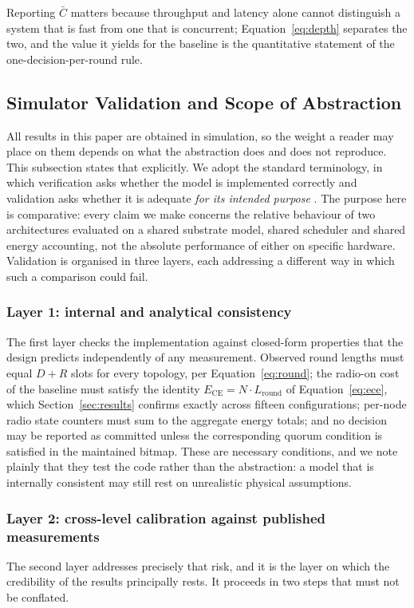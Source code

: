 \documentclass[journal]{IEEEtran}
\newcommand{\Nnodes}{N}                   %
\newcommand{\Diam}{D}                     %
\newcommand{\Nretx}{R}                    %
\newcommand{\Lround}{L_{\mathrm{round}}}  %
\newcommand{\Cdepth}{\bar{C}}             %
\newcommand{\Ece}{E_{\mathrm{CE}}}        %
\begin{document}
Reporting $\Cdepth$ matters because throughput and latency alone cannot
distinguish a system that is fast from one that is concurrent;
Equation~\eqref{eq:depth} separates the two, and the value it yields for
the baseline is the quantitative statement of the one-decision-per-round
rule.

\subsection{Simulator Validation and Scope of Abstraction}
\label{sec:method-validation}
All results in this paper are obtained in simulation, so the weight a
reader may place on them depends on what the abstraction does and does not
reproduce. This subsection states that explicitly. We adopt the standard
terminology, in which verification asks whether the model is implemented
correctly and validation asks whether it is adequate \emph{for its
intended purpose} \cite{sargent13validation}. The purpose here is
comparative: every claim we make concerns the relative behaviour of two
architectures evaluated on a shared substrate model, shared scheduler and
shared energy accounting, not the absolute performance of either on
specific hardware. Validation is organised in three layers, each
addressing a different way in which such a comparison could fail.

\subsubsection{Layer 1: internal and analytical consistency}
The first layer checks the implementation against closed-form properties
that the design predicts independently of any measurement. Observed round
lengths must equal $\Diam + \Nretx$ slots for every topology, per
Equation~\eqref{eq:round}; the radio-on cost of the baseline must satisfy
the identity $\Ece = \Nnodes \cdot \Lround$ of
Equation~\eqref{eq:ece}, which Section~\ref{sec:results} confirms exactly
across fifteen configurations; per-node radio state
counters must sum to the aggregate energy totals; and no decision may be
reported as committed unless the corresponding quorum condition is
satisfied in the maintained bitmap. These are necessary conditions, and we
note plainly that they test the code rather than the abstraction: a model
that is internally consistent may still rest on unrealistic physical
assumptions.

\subsubsection{Layer 2: cross-level calibration against published measurements}
The second layer addresses precisely that risk, and it is the layer on
which the credibility of the results principally rests. It proceeds in two
steps that must not be conflated.
\end{document}
